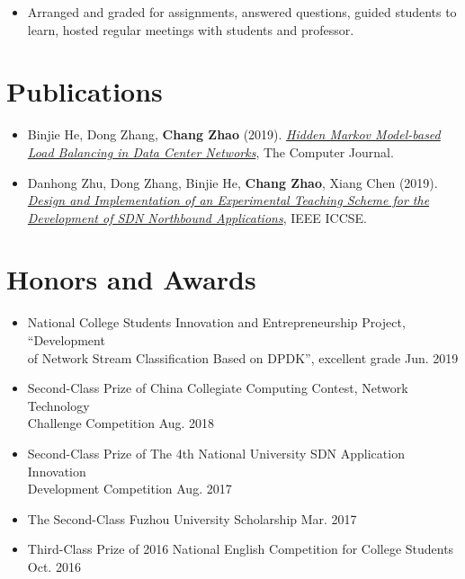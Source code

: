 \documentclass{resume}
\begin{document}
\begin{itemize}
  \item Arranged and graded for assignments, answered questions, guided students to learn, hosted regular meetings with students and professor.
\end{itemize}

\section{Publications}
\begin{itemize}
  \item Binjie He, Dong Zhang, \textbf{Chang Zhao} (2019). \href{https://academic.oup.com/comjnl/advance-article-abstract/doi/10.1093/comjnl/bxz142/5666159}{\textit{Hidden Markov Model-based Load Balancing in Data Center Networks}}, The
  Computer Journal.
  \item Danhong Zhu, Dong Zhang, Binjie He, \textbf{Chang Zhao}, Xiang Chen (2019). \href{https://ieeexplore.ieee.org/document/8845443}{\textit{Design and Implementation of an Experimental Teaching Scheme for the Development of SDN Northbound Applications}}, IEEE ICCSE.
\end{itemize}

\section{Honors and Awards}
\begin{itemize}
  \item National College Students Innovation and Entrepreneurship Project, ``Development \\of Network Stream Classification Based on DPDK'', excellent grade \hfill Jun. 2019
  \item Second-Class Prize of China Collegiate Computing Contest, Network Technology \\Challenge Competition \hfill Aug. 2018 
  \item Second-Class Prize of The 4th National University SDN Application Innovation \\Development Competition \hfill Aug. 2017
  \item The Second-Class Fuzhou University Scholarship \hfill Mar. 2017
  \item Third-Class Prize of 2016 National English Competition for College Students \hfill Oct. 2016
\end{itemize}
\end{document}
